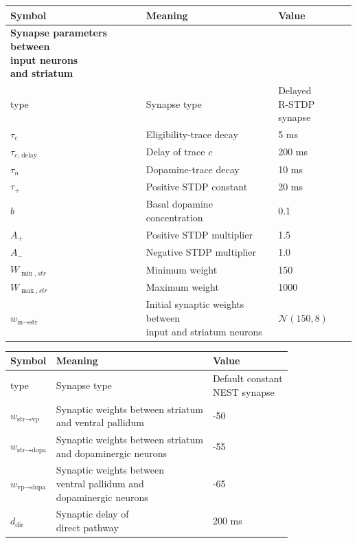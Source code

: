 \documentclass[a4paper,12pt,openright]{book}
\let\oldtable\table
\let\endoldtable\endtable
\renewenvironment{table}[1][htbp] %
{
    \oldtable[#1]
    \footnotesize                     %
}
{
    \endoldtable
}
\begin{document}
\begin{table}[htbp]
\begin{tabular}{lll}
\textbf{Symbol} & \textbf{Meaning} & \textbf{Value} \\ \hline
\thead[l]{\bfseries Synapse parameters between \\
\bfseries input neurons \\
\bfseries and striatum} \\ \hline
type & Synapse type & \makecell[l]{Delayed \\ R-STDP synapse} \\ \hline
\(\tau_{c}\) & Eligibility-trace decay & 5 ms \\ \hline
\(\tau_{c\text{, delay}}\) & Delay of trace $c$ & 200 ms \\ \hline
\(\tau_{n}\) & Dopamine-trace decay & 10 ms \\ \hline
\(\tau_{+}\) & Positive STDP constant & 20 ms \\ \hline
\(b\) & \makecell[l]{Basal dopamine \\ concentration} & 0.1  \\ \hline
\(A_{+}\) & Positive STDP multiplier & 1.5 \\ \hline
\(A_{-}\) & Negative STDP multiplier & 1.0 \\ \hline
\(W_{\min,str}\) & Minimum weight & 150 \\ \hline
\(W_{\max,str}\) & Maximum weight & 1000 \\ \hline
\(w_{\text{in}\to \text{str}}\) & \makecell[l]{Initial synaptic weights between \\ input and striatum neurons} & \(\mathcal{N}(150, 8)\) \\ \hline
\end{tabular}
\caption{Synapse parameters between input and striatum}
\label{tab:params4}
\end{table}
\begin{table}[htbp]
\begin{tabular}{lll}
\textbf{Symbol} & \textbf{Meaning} & \textbf{Value} \\ \hline
type & Synapse type & \makecell[l]{Default constant \\ NEST synapse} \\ \hline
\(w_{\text{str}\to\text{vp}}\) & \makecell[l]{Synaptic weights between striatum \\ and ventral pallidum} & -50 \\ \hline
\(w_{\text{str}\to\text{dopa}}\) & \makecell[l]{Synaptic weights between striatum \\ and dopaminergic neurons} & -55 \\ \hline
\(w_{\text{vp}\to\text{dopa}}\) & \makecell[l]{Synaptic weights between \\ ventral pallidum and \\ dopaminergic neurons} & -65 \\ \hline
\(d_{\text{dir}}\) & \makecell[l]{Synaptic delay of \\ direct pathway} & 200 ms \\ \hline
\end{tabular}
\caption{Critic synapse parameters}
\label{tab:params5}
\end{table}
\end{document}
